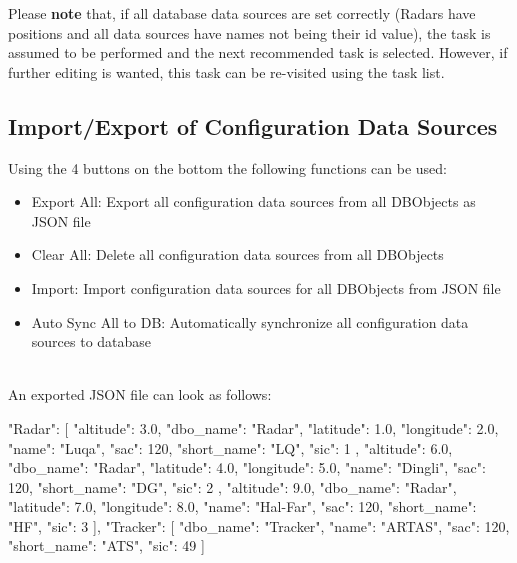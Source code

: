 Please \textbf{note} that, if all database data sources are set correctly (Radars have positions and all data sources have names not being their id value), the task is assumed to be performed and the next recommended task is selected. However, if further editing is wanted, this task can be re-visited using the task list.

\subsection{Import/Export of Configuration Data Sources}
\label{sec:config_ds_export}

Using the 4 buttons on the bottom the following functions can be used:

\begin{itemize}  
\item Export All: Export all configuration data sources from all DBObjects as JSON file
\item Clear All: Delete all configuration data sources from all DBObjects
\item Import: Import configuration data sources for all DBObjects from JSON file
\item Auto Sync All to DB: Automatically synchronize all configuration data sources to database
\end{itemize}
\ \\

An exported JSON file can look as follows:

\begin{cverbatim}
{
    "Radar": [
        {
            "altitude": 3.0,
            "dbo_name": "Radar",
            "latitude": 1.0,
            "longitude": 2.0,
            "name": "Luqa",
            "sac": 120,
            "short_name": "LQ",
            "sic": 1
        },
        {
            "altitude": 6.0,
            "dbo_name": "Radar",
            "latitude": 4.0,
            "longitude": 5.0,
            "name": "Dingli",
            "sac": 120,
            "short_name": "DG",
            "sic": 2
        },
        {
            "altitude": 9.0,
            "dbo_name": "Radar",
            "latitude": 7.0,
            "longitude": 8.0,
            "name": "Hal-Far",
            "sac": 120,
            "short_name": "HF",
            "sic": 3
        }
    ],
    "Tracker": [
        {
            "dbo_name": "Tracker",
            "name": "ARTAS",
            "sac": 120,
            "short_name": "ATS",
            "sic": 49
        }
    ]
}
\end{cverbatim}

